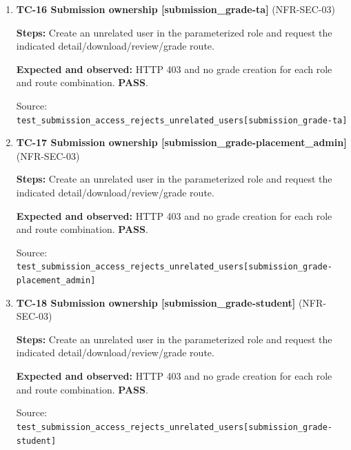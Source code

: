 \begin{enumerate}
\item \begin{minipage}[t]{\linewidth}\textbf{TC-16 Submission ownership [submission\_grade-ta]} (NFR-SEC-03)\par

\textbf{Steps:} Create an unrelated user in the parameterized role and request the indicated detail/download/review/grade route.\par

\textbf{Expected and observed:} HTTP 403 and no grade creation for each role and route combination. \textbf{PASS}.\par

{\footnotesize Source: \nolinkurl{test_submission_access_rejects_unrelated_users[submission_grade-ta]}}\end{minipage}

\item \begin{minipage}[t]{\linewidth}\textbf{TC-17 Submission ownership [submission\_grade-placement\_admin]} (NFR-SEC-03)\par

\textbf{Steps:} Create an unrelated user in the parameterized role and request the indicated detail/download/review/grade route.\par

\textbf{Expected and observed:} HTTP 403 and no grade creation for each role and route combination. \textbf{PASS}.\par

{\footnotesize Source: \nolinkurl{test_submission_access_rejects_unrelated_users[submission_grade-placement_admin]}}\end{minipage}

\item \begin{minipage}[t]{\linewidth}\textbf{TC-18 Submission ownership [submission\_grade-student]} (NFR-SEC-03)\par

\textbf{Steps:} Create an unrelated user in the parameterized role and request the indicated detail/download/review/grade route.\par

\textbf{Expected and observed:} HTTP 403 and no grade creation for each role and route combination. \textbf{PASS}.\par

{\footnotesize Source: \nolinkurl{test_submission_access_rejects_unrelated_users[submission_grade-student]}}\end{minipage}


\end{enumerate}
